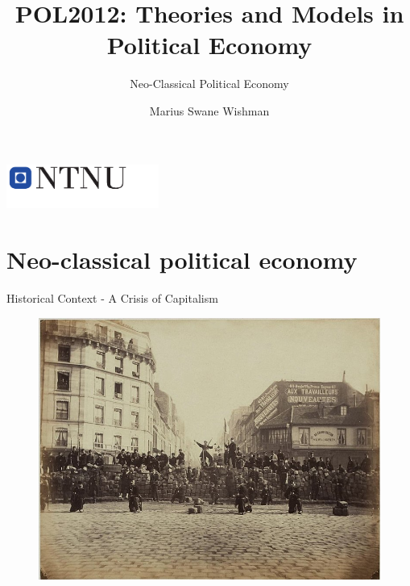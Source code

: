 \documentclass{beamer}
\title{POL2012: Theories and Models in Political Economy}
\subtitle{Neo-Classical Political Economy}
\date{}
\author{Marius Swane Wishman}
\institute{Department of Sociology and Political Science}
\begin{document}
\begin{frame}[plain]
\titlepage %
\centering %
\includegraphics[width=5cm]{logo_ntnu_u-slagord.pdf}
\end{frame}


\section{Neo-classical political economy} %


\begin{frame}{Historical Context - A Crisis of Capitalism}

	\begin{figure}
		\centering
		\includegraphics[width=0.8\linewidth]{../img/Commune.jpg}
		\label{commune}
	\end{figure}

\end{frame}
\end{document}
